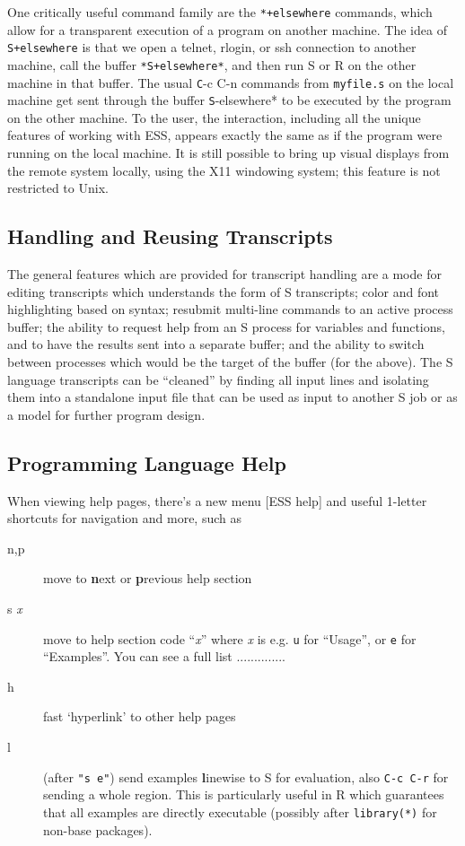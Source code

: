 \documentclass{article}
\begin{document}
One critically useful command family are the \verb|*+elsewhere|
commands, which allow for a transparent execution of a program on
another machine.  The idea of \verb|S+elsewhere| is that we open a
telnet, rlogin, or ssh connection to another machine, call the buffer
\verb|*S+elsewhere*|, and then run S or R on the other machine in that
buffer.  The usual {\texttt C-c C-n} commands from
{\small\texttt{myfile.s}} on the local machine get sent through the
buffer {\texttt *S-elsewhere*} to be executed by the program on the
other machine.  To the user, the interaction, including all the unique
features of working with ESS, appears exactly the same as if the
program were running on the local machine.  It is still possible to
bring up visual displays from the remote system locally, using the X11
windowing system; this feature is not restricted to Unix.

\subsection{Handling and Reusing Transcripts}
\label{sec:S:trans}

The general features which are provided for transcript handling are a
mode for editing transcripts which understands the form of S
transcripts; color and font highlighting based on syntax; resubmit
multi-line commands to an active process buffer; the ability to
request help from an S process for variables and functions, and to
have the results sent into a separate buffer; and the ability to
switch between processes which would be the target of the buffer (for
the above).  The S language transcripts can be ``cleaned'' by
finding all input lines and isolating them into a standalone input file
that can be used as input to another S job or as a model for further
program design.


\subsection{Programming Language Help}
\label{sec:S:help}
When viewing help pages, there's a new menu \textsf{[ESS help]} and
useful 1-letter shortcuts for navigation and more, such as
\begin{description}
\item[n,p] move to \textbf{n}ext or \textbf{p}revious help section
\item[s \textit{x}] move to help section code ``\textit{x}'' where
  \textit{x} is e.g. \texttt{u} for ``Usage'', or \texttt{e} for
  ``Examples''.  You can see a full list ..............
\item[h] fast `hyperlink' to other help pages
\item[l] (after \texttt{"s e"}) send examples \textbf{l}inewise to S for
  evaluation, also \texttt{C-c C-r} for sending a whole region.  This 
  is particularly useful in R which guarantees that all examples are
  directly executable (possibly after \texttt{library(*)} for non-base
  packages).
\end{description}
\end{document}
